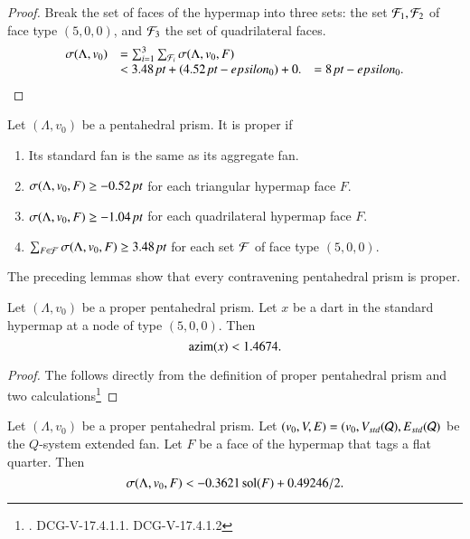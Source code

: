 \begin{proof}
Break the set of faces of the hypermap into three sets:
the set ${\mathcal F}_1,{\mathcal F}_2$ of face type $(5,0,0)$, and ${\mathcal F}_3$ the set
of quadrilateral faces.
  $$
  \begin{array}{llll}
  \sigma(\Lambda,v_0) &= \sum_{i=1}^3\sum_{{\mathcal F}_i}\sigma(\Lambda,v_0,F)\\
    &< 3.48\,\hbox{\it pt} + (4.52\,\hbox{\it pt} - epsilon_0) + 0.
    &= 8\,\hbox{\it pt} - epsilon_0.
  \end{array}
  $$
\end{proof}

\begin{definition}
Let $(\Lambda,v_0)$ be a pentahedral prism.
It is proper if 
\begin{enumerate}
  \item  Its standard fan is the same as its aggregate fan.
  \item $\sigma(\Lambda,v_0,F) \ge -0.52\,\hbox{\it pt}$ for each triangular hypermap face $F$.
  \item $\sigma(\Lambda,v_0,F) \ge -1.04\,\hbox{\it pt}$ for each quadrilateral hypermap face $F$.
  \item $\sum_{F\in{\mathcal F}} \sigma(\Lambda,v_0,F) \ge 3.48\,\hbox{\it pt}$ for each set ${\mathcal F}$ of face type $(5,0,0)$.
\end{enumerate}
\end{definition}

The preceding lemmas show that every contravening pentahedral prism is proper.

\begin{lemma}
Let $(\Lambda,v_0)$ be a proper pentahedral prism.  
Let $x$ be a dart in the standard hypermap at a node of type $(5,0,0)$.
Then $${\operatorname{azim}}(x) < 1.4674.$$
\end{lemma}

\begin{proof}
The follows directly from the definition of proper pentahedral prism
and two calculations\footnote{ .  DCG-V-17.4.1.1. DCG-V-17.4.1.2}
\end{proof}

\begin{lemma}
Let $(\Lambda,v_0)$ be a proper pentahedral prism.
Let $(v_0,V,E) = (v_0,V_{std}({\mathcal Q}),E_{std}({\mathcal Q})$ be the $Q$-system
extended fan.  Let $F$ be a face of the
hypermap that
tags a
flat quarter.  Then
   $$\sigma(\Lambda,v_0,F) < -0.3621 \operatorname{sol}(F) + 0.49246/2.$$
\end{lemma}

